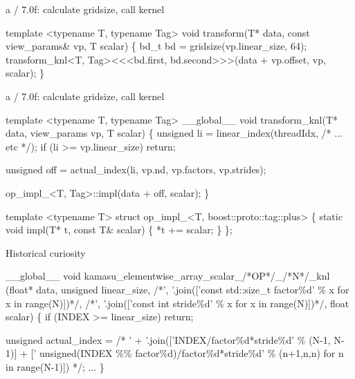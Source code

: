 
\begin{frame}[fragile]{a / 7.0f: calculate gridsize, call kernel}
\begin{semiverbatim}
template <typename T, typename Tag>
void 
transform(T* data, const view_params& vp, T scalar)
\{
   bd_t bd = gridsize(vp.linear_size, 64);
   transform_knl<T, Tag><\hskip0pt<\hskip0pt<bd.first, 
                           bd.second>\hskip0pt>\hskip0pt>(data + vp.offset, 
                                        vp, scalar);
\}
\end{semiverbatim}
\note{ 
}
\end{frame}


\begin{frame}[fragile]{a / 7.0f: calculate gridsize, call kernel}
\begin{semiverbatim}template <typename T, typename Tag>
__global__ void 
transform_knl(T* data, view_params vp, T scalar)
\{
  unsigned li = linear_index(threadIdx, /* ... etc */);
  if (li >= vp.linear_size) return;

  unsigned off = actual_index(li, vp.nd, vp.factors, vp.strides);

  op_impl_<T, Tag>::impl(data + off, scalar); 
\}

template <typename T>
struct op_impl_<T, boost::proto::tag::plus>
\{
  static void impl(T* t, const T& scalar)
  \{
    *t += scalar;
  \}
\};
\end{semiverbatim}
\end{frame}


\begin{frame}[fragile]{Historical curiosity}
\begin{semiverbatim}
__global__ void
kamasu_elementwise_array_scalar_/*OP*/_/*N*/_knl
(float* data,
 unsigned linear_size,
 /*', '.join(['const std::size_t factor\%d' \% x for x in range(N)])*/,
 /*', '.join(['const int stride\%d' \% x for x in range(N)])*/,
 float scalar)
\{
  if (INDEX >= linear_size)
    return;

  unsigned actual_index = 
    /* ' + '.join(['INDEX/factor\%d*stride\%d' \% (N-1, N-1)]
                  + [' unsigned(INDEX \%\% factor\%d)/factor\%d*stride\%d' 
                     \% (n+1,n,n) for n in range(N-1)]) */;
  ...
\}
\end{semiverbatim}
\end{frame}

